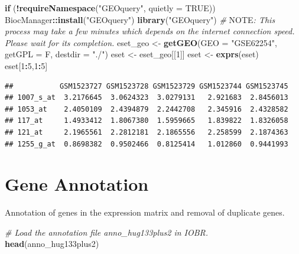 \documentclass[
  12pt,
]{book}
\newenvironment{Shaded}{\begin{snugshade}}{\end{snugshade}}
\newcommand{\AlertTok}[1]{\textcolor[rgb]{0.94,0.16,0.16}{#1}}
\newcommand{\AttributeTok}[1]{\textcolor[rgb]{0.13,0.29,0.53}{#1}}
\newcommand{\CommentTok}[1]{\textcolor[rgb]{0.56,0.35,0.01}{\textit{#1}}}
\newcommand{\ConstantTok}[1]{\textcolor[rgb]{0.56,0.35,0.01}{#1}}
\newcommand{\ControlFlowTok}[1]{\textcolor[rgb]{0.13,0.29,0.53}{\textbf{#1}}}
\newcommand{\DecValTok}[1]{\textcolor[rgb]{0.00,0.00,0.81}{#1}}
\newcommand{\FunctionTok}[1]{\textcolor[rgb]{0.13,0.29,0.53}{\textbf{#1}}}
\newcommand{\NormalTok}[1]{#1}
\newcommand{\OtherTok}[1]{\textcolor[rgb]{0.56,0.35,0.01}{#1}}
\newcommand{\SpecialCharTok}[1]{\textcolor[rgb]{0.81,0.36,0.00}{\textbf{#1}}}
\newcommand{\StringTok}[1]{\textcolor[rgb]{0.31,0.60,0.02}{#1}}
\begin{document}
\begin{Shaded}
\begin{Highlighting}[]
\ControlFlowTok{if}\NormalTok{ (}\SpecialCharTok{!}\FunctionTok{requireNamespace}\NormalTok{(}\StringTok{"GEOquery"}\NormalTok{, }\AttributeTok{quietly =} \ConstantTok{TRUE}\NormalTok{))  BiocManager}\SpecialCharTok{::}\FunctionTok{install}\NormalTok{(}\StringTok{"GEOquery"}\NormalTok{)}
\FunctionTok{library}\NormalTok{(}\StringTok{"GEOquery"}\NormalTok{)}
\CommentTok{\# }\AlertTok{NOTE}\CommentTok{: This process may take a few minutes which depends on the internet connection speed. Please wait for its completion.}
\NormalTok{eset\_geo }\OtherTok{\textless{}{-}} \FunctionTok{getGEO}\NormalTok{(}\AttributeTok{GEO =} \StringTok{"GSE62254"}\NormalTok{, }\AttributeTok{getGPL  =}\NormalTok{ F, }\AttributeTok{destdir =} \StringTok{"./"}\NormalTok{)}
\NormalTok{eset    }\OtherTok{\textless{}{-}}\NormalTok{ eset\_geo[[}\DecValTok{1}\NormalTok{]]}
\NormalTok{eset    }\OtherTok{\textless{}{-}} \FunctionTok{exprs}\NormalTok{(eset)}
\NormalTok{eset[}\DecValTok{1}\SpecialCharTok{:}\DecValTok{5}\NormalTok{,}\DecValTok{1}\SpecialCharTok{:}\DecValTok{5}\NormalTok{]}
\end{Highlighting}
\end{Shaded}

\begin{verbatim}
##           GSM1523727 GSM1523728 GSM1523729 GSM1523744 GSM1523745
## 1007_s_at  3.2176645  3.0624323  3.0279131   2.921683  2.8456013
## 1053_at    2.4050109  2.4394879  2.2442708   2.345916  2.4328582
## 117_at     1.4933412  1.8067380  1.5959665   1.839822  1.8326058
## 121_at     2.1965561  2.2812181  2.1865556   2.258599  2.1874363
## 1255_g_at  0.8698382  0.9502466  0.8125414   1.012860  0.9441993
\end{verbatim}

\hypertarget{gene-annotation-1}{%
\section{Gene Annotation}\label{gene-annotation-1}}

Annotation of genes in the expression matrix and removal of duplicate genes.

\begin{Shaded}
\begin{Highlighting}[]
\CommentTok{\# Load the annotation file \textasciigrave{}anno\_hug133plus2\textasciigrave{} in IOBR.}
\FunctionTok{head}\NormalTok{(anno\_hug133plus2)}
\end{Highlighting}
\end{Shaded}
\end{document}
